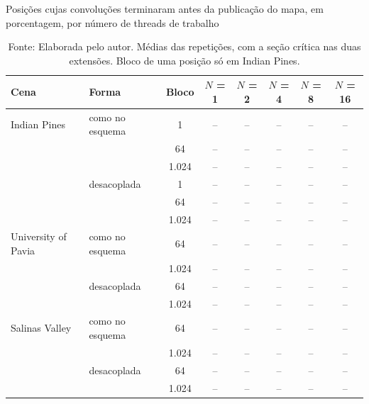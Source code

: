 \begin{table}[H]
    \centering
    \caption{Posições cujas convoluções terminaram antes da publicação do mapa, em porcentagem, por número de threads de trabalho}
    \small
    \setlength{\tabcolsep}{3pt}
    \begin{tabular}{|l|l|c|c|c|c|c|c|}
        \hline
        \rowcolor[HTML]{C0C0C0}
        \textbf{Cena} & \textbf{Forma} & \textbf{Bloco} & \textbf{$N$ = 1} & \textbf{$N$ = 2} & \textbf{$N$ = 4} & \textbf{$N$ = 8} & \textbf{$N$ = 16} \\
        \hline
        Indian Pines & como no esquema & 1 & -- & -- & -- & -- & -- \\ \cline{3-8}
         &  & 64 & -- & -- & -- & -- & -- \\ \cline{3-8}
         &  & 1.024 & -- & -- & -- & -- & -- \\ \cline{2-8}
         & desacoplada & 1 & -- & -- & -- & -- & -- \\ \cline{3-8}
         &  & 64 & -- & -- & -- & -- & -- \\ \cline{3-8}
         &  & 1.024 & -- & -- & -- & -- & -- \\ \hline
        University of Pavia & como no esquema & 64 & -- & -- & -- & -- & -- \\ \cline{3-8}
         &  & 1.024 & -- & -- & -- & -- & -- \\ \cline{2-8}
         & desacoplada & 64 & -- & -- & -- & -- & -- \\ \cline{3-8}
         &  & 1.024 & -- & -- & -- & -- & -- \\ \hline
        Salinas Valley & como no esquema & 64 & -- & -- & -- & -- & -- \\ \cline{3-8}
         &  & 1.024 & -- & -- & -- & -- & -- \\ \cline{2-8}
         & desacoplada & 64 & -- & -- & -- & -- & -- \\ \cline{3-8}
         &  & 1.024 & -- & -- & -- & -- & -- \\ \hline
    \end{tabular}
    \captionsetup{justification=raggedright}
    \caption*{Fonte: Elaborada pelo autor. Médias das repetições, com a seção crítica nas duas extensões. Bloco de uma posição só em Indian Pines. }
    \label{tab:fusaoSobreposicao}
\end{table}


